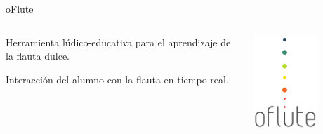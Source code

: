 {

\begin{frame}{oFlute}
  \begin{columns}

    \begin{block}{}
      \begin{center}
        \Large
        Herramienta lúdico-educativa para el aprendizaje de la flauta dulce.

        \medskip
        \medskip

        Interacción del alumno con la flauta en tiempo real.
      \end{center}
    \end{block}

    \begin{block}{}
      \begin{center}
        \vspace{-1.5cm}
        \includegraphics[width=0.6\textwidth]{imagenes/logotipo}


\end{center}
\end{block}
\end{columns}
\end{frame}}

